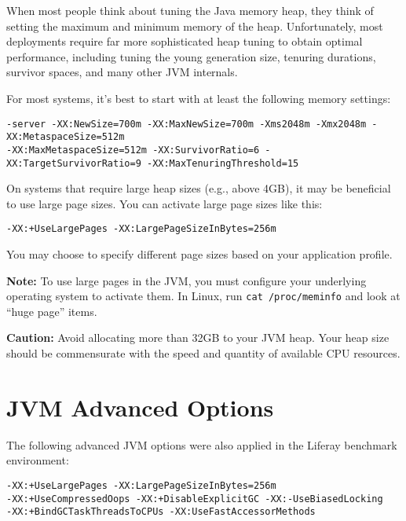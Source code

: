 When most people think about tuning the Java memory heap, they think of
setting the maximum and minimum memory of the heap. Unfortunately, most
deployments require far more sophisticated heap tuning to obtain optimal
performance, including tuning the young generation size, tenuring
durations, survivor spaces, and many other JVM internals.

For most systems, it's best to start with at least the following memory
settings:

\begin{verbatim}
-server -XX:NewSize=700m -XX:MaxNewSize=700m -Xms2048m -Xmx2048m -XX:MetaspaceSize=512m
-XX:MaxMetaspaceSize=512m -XX:SurvivorRatio=6 -XX:TargetSurvivorRatio=9 -XX:MaxTenuringThreshold=15
\end{verbatim}

On systems that require large heap sizes (e.g., above 4GB), it may be
beneficial to use large page sizes. You can activate large page sizes
like this:

\begin{verbatim}
-XX:+UseLargePages -XX:LargePageSizeInBytes=256m
\end{verbatim}

You may choose to specify different page sizes based on your application
profile.

\textbf{Note:} To use large pages in the JVM, you must configure your
underlying operating system to activate them. In Linux, run
\texttt{cat\ /proc/meminfo} and look at ``huge page'' items.

\noindent\hrulefill

\textbf{Caution:} Avoid allocating more than 32GB to your JVM heap. Your
heap size should be commensurate with the speed and quantity of
available CPU resources.

\noindent\hrulefill

\section{JVM Advanced Options}\label{jvm-advanced-options}

The following advanced JVM options were also applied in the Liferay
benchmark environment:

\begin{verbatim}
-XX:+UseLargePages -XX:LargePageSizeInBytes=256m 
-XX:+UseCompressedOops -XX:+DisableExplicitGC -XX:-UseBiasedLocking 
-XX:+BindGCTaskThreadsToCPUs -XX:UseFastAccessorMethods
\end{verbatim}

